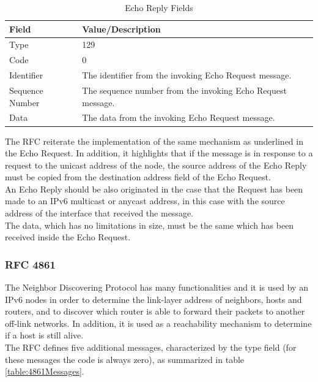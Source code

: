 \documentclass[12pt]{article}
\begin{document}
\begin{savenotes}
\begin{table}[!htpb]
\centering
\begin{tabular}{|L{2.0cm}|L{10.0cm}|}
\hline
Field&Value/Description\\
\hline
Type&129\\
\hline
Code&0\\
\hline
Identifier&The identifier from the invoking Echo Request message.\\
\hline
Sequence Number&The sequence number from the invoking Echo Request message.\\
\hline
Data&The data from the invoking Echo Request message.\\
\hline
\end{tabular}
\caption{Echo Reply Fields}
\label{table:echoRepFields}
\end{table}
\end{savenotes}
The RFC reiterate the implementation of the same mechanism as underlined in the Echo Request. In addition, it highlights that if the message is in response to a request to the unicast address of the node, the source 
address of the Echo Reply must be copied from the destination address field of the Echo Request.\\
An Echo Reply should be also originated in the case that the Request has been made to an IPv6 multicast or anycast address, in this case with the source address of the interface that received the message.\\
The data, which has no limitations in size, must be the same which has been received inside the Echo Request.


\subsubsection{RFC 4861}
\label{subsub:4861}

The Neighbor Discovering Protocol has many functionalities and it is used by an IPv6 nodes in order to determine the link-layer address of neighbors, hosts and routers, and to discover which router is able to forward 
their packets to another off-link networks. In addition, it is used as a reachability mechanism to determine if a host is still alive.\\
The RFC defines five additional messages, characterized by the type field (for these messages the code is always zero), as summarized in table \ref{table:4861Messages}.
\end{document}
